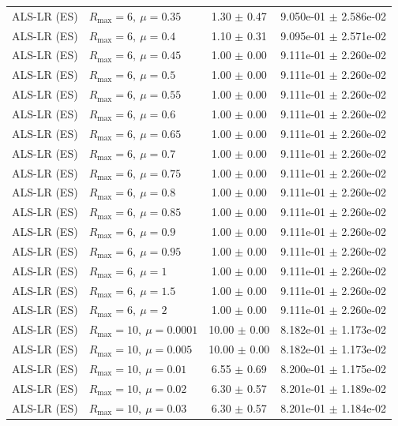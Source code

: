 \begin{table}[t]
\begin{tabular}{@{}llcc@{}}
ALS-LR (ES) & \(R_{\max}=6,\ \mu=0.35\) & 1.30 $\pm$ 0.47 & 9.050e-01 $\pm$ 2.586e-02 \\
ALS-LR (ES) & \(R_{\max}=6,\ \mu=0.4\) & 1.10 $\pm$ 0.31 & 9.095e-01 $\pm$ 2.571e-02 \\
ALS-LR (ES) & \(R_{\max}=6,\ \mu=0.45\) & 1.00 $\pm$ 0.00 & 9.111e-01 $\pm$ 2.260e-02 \\
ALS-LR (ES) & \(R_{\max}=6,\ \mu=0.5\) & 1.00 $\pm$ 0.00 & 9.111e-01 $\pm$ 2.260e-02 \\
ALS-LR (ES) & \(R_{\max}=6,\ \mu=0.55\) & 1.00 $\pm$ 0.00 & 9.111e-01 $\pm$ 2.260e-02 \\
ALS-LR (ES) & \(R_{\max}=6,\ \mu=0.6\) & 1.00 $\pm$ 0.00 & 9.111e-01 $\pm$ 2.260e-02 \\
ALS-LR (ES) & \(R_{\max}=6,\ \mu=0.65\) & 1.00 $\pm$ 0.00 & 9.111e-01 $\pm$ 2.260e-02 \\
ALS-LR (ES) & \(R_{\max}=6,\ \mu=0.7\) & 1.00 $\pm$ 0.00 & 9.111e-01 $\pm$ 2.260e-02 \\
ALS-LR (ES) & \(R_{\max}=6,\ \mu=0.75\) & 1.00 $\pm$ 0.00 & 9.111e-01 $\pm$ 2.260e-02 \\
ALS-LR (ES) & \(R_{\max}=6,\ \mu=0.8\) & 1.00 $\pm$ 0.00 & 9.111e-01 $\pm$ 2.260e-02 \\
ALS-LR (ES) & \(R_{\max}=6,\ \mu=0.85\) & 1.00 $\pm$ 0.00 & 9.111e-01 $\pm$ 2.260e-02 \\
ALS-LR (ES) & \(R_{\max}=6,\ \mu=0.9\) & 1.00 $\pm$ 0.00 & 9.111e-01 $\pm$ 2.260e-02 \\
ALS-LR (ES) & \(R_{\max}=6,\ \mu=0.95\) & 1.00 $\pm$ 0.00 & 9.111e-01 $\pm$ 2.260e-02 \\
ALS-LR (ES) & \(R_{\max}=6,\ \mu=1\) & 1.00 $\pm$ 0.00 & 9.111e-01 $\pm$ 2.260e-02 \\
ALS-LR (ES) & \(R_{\max}=6,\ \mu=1.5\) & 1.00 $\pm$ 0.00 & 9.111e-01 $\pm$ 2.260e-02 \\
ALS-LR (ES) & \(R_{\max}=6,\ \mu=2\) & 1.00 $\pm$ 0.00 & 9.111e-01 $\pm$ 2.260e-02 \\
ALS-LR (ES) & \(R_{\max}=10,\ \mu=0.0001\) & 10.00 $\pm$ 0.00 & 8.182e-01 $\pm$ 1.173e-02 \\
ALS-LR (ES) & \(R_{\max}=10,\ \mu=0.005\) & 10.00 $\pm$ 0.00 & 8.182e-01 $\pm$ 1.173e-02 \\
ALS-LR (ES) & \(R_{\max}=10,\ \mu=0.01\) & 6.55 $\pm$ 0.69 & 8.200e-01 $\pm$ 1.175e-02 \\
ALS-LR (ES) & \(R_{\max}=10,\ \mu=0.02\) & 6.30 $\pm$ 0.57 & 8.201e-01 $\pm$ 1.189e-02 \\
ALS-LR (ES) & \(R_{\max}=10,\ \mu=0.03\) & 6.30 $\pm$ 0.57 & 8.201e-01 $\pm$ 1.184e-02 \\

\end{tabular}
\end{table}
